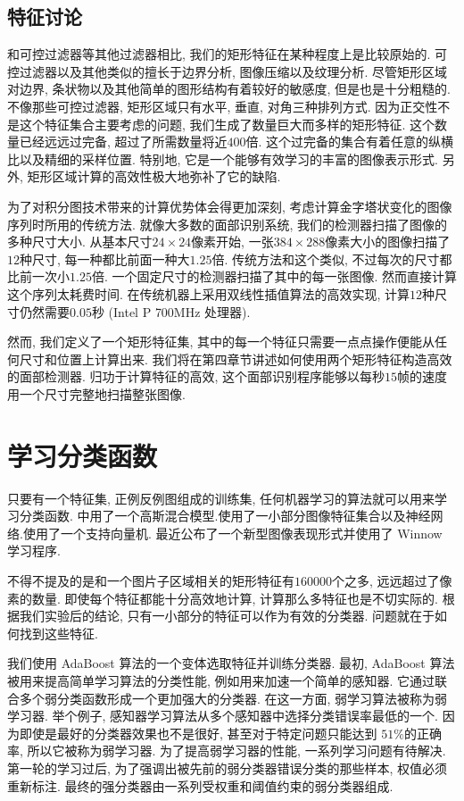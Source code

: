 \documentclass[a4paper,utf8,11pt, onecolumn]{ctexart}
\newcommand{\RN}[1]{%
  \textup{\uppercase\expandafter{\romannumeral#1}}%
}
\begin{document}
\subsection{特征讨论}
和可控过滤器\citep{freeman1991design,greenspan1994overcomplete}等其他过滤器相比, 我们的矩形特征在某种程度上是比较原始的. 可控过滤器以及其他类似的擅长于边界分析, 图像压缩以及纹理分析. 
尽管矩形区域对边界, 条状物以及其他简单的图形结构有着较好的敏感度, 但是也是十分粗糙的. 不像那些可控过滤器, 矩形区域只有水平, 垂直, 对角三种排列方式. 因为正交性不是这个特征集合主要考虑的问题, 我们生成了数量巨大而多样的矩形特征. 这个数量已经远远过完备, 超过了所需数量将近$400$倍.
这个过完备的集合有着任意的纵横比以及精细的采样位置. 特别地, 它是一个能够有效学习的丰富的图像表示形式. 另外, 矩形区域计算的高效性极大地弥补了它的缺陷. 

为了对积分图技术带来的计算优势体会得更加深刻, 考虑计算金字塔状变化的图像序列时所用的传统方法. 就像大多数的面部识别系统, 我们的检测器扫描了图像的多种尺寸大小. 从基本尺寸$24\times24$像素开始, 一张$384\times288$像素大小的图像扫描了$12$种尺寸, 每一种都比前面一种大$1.25$倍.
传统方法和这个类似, 不过每次的尺寸都比前一次小$1.25$倍. 一个固定尺寸的检测器扫描了其中的每一张图像. 然而直接计算这个序列太耗费时间. 在传统机器上采用双线性插值算法的高效实现, 计算$12$种尺寸仍然需要$0.05$秒 (Intel P\RN{3} 700MHz 处理器).

然而, 我们定义了一个矩形特征集, 其中的每一个特征只需要一点点操作便能从任何尺寸和位置上计算出来. 我们将在第四章节讲述如何使用两个矩形特征构造高效的面部检测器. 归功于计算特征的高效, 这个面部识别程序能够以每秒$15$帧的速度用一个尺寸完整地扫描整张图像.

\section{学习分类函数}\label{sec:learning}
只要有一个特征集, 正例反例图组成的训练集, 任何机器学习的算法就可以用来学习分类函数. \citet{sung1998example}中用了一个高斯混合模型.\citet{rowley1998neural}使用了一小部分图像特征集合以及神经网络.\citet{osuna1997training-2}使用了一个支持向量机. 最近\citet{yang2000snow}公布了一个新型图像表现形式并使用了 Winnow 学习程序.

不得不提及的是和一个图片子区域相关的矩形特征有$160000$个之多, 远远超过了像素的数量. 即使每个特征都能十分高效地计算, 计算那么多特征也是不切实际的. 根据我们实验后的结论, 只有一小部分的特征可以作为有效的分类器. 问题就在于如何找到这些特征.

我们使用 AdaBoost 算法的一个变体选取特征并训练分类器\citep{freund1995desicion}. 最初, AdaBoost 算法被用来提高简单学习算法的分类性能, 例如用来加速一个简单的感知器. 它通过联合多个弱分类函数形成一个更加强大的分类器. 在这一方面, 弱学习算法被称为弱学习器.
举个例子, 感知器学习算法从多个感知器中选择分类错误率最低的一个. 因为即使是最好的分类器效果也不是很好, 甚至对于特定问题只能达到 $51\%$的正确率, 所以它被称为弱学习器.
为了提高弱学习器的性能, 一系列学习问题有待解决. 第一轮的学习过后, 为了强调出被先前的弱分类器错误分类的那些样本, 权值必须重新标注. 最终的强分类器由一系列受权重和阈值约束的弱分类器组成.
\end{document}
